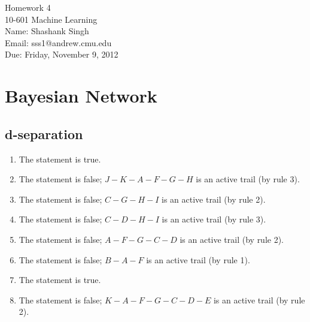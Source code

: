 \documentclass[11pt]{article}
\makeatletter
\newcommand{\myname}{Shashank Singh}
\newcommand{\myandrew}{sss1@andrew.cmu.edu}
\newcommand{\myclass}{10-601 Machine Learning}
\newcommand{\myhwnum}{4}
\newcommand{\duedate}{Friday, November 9, 2012}
\makeatother
\begin{document}
\thispagestyle{plain}

{\Large Homework \myhwnum} \\
\myclass \\
Name: \myname \\
Email: \myandrew \\
Due: \duedate \\
\section{Bayesian Network}
\subsection{d-separation}
\begin{enumerate}[1.]
\item The statement is true.

\item The statement is false; $J-K-A-F-G-H$ is an active trail (by rule 3).

\item The statement is false; $C-G-H-I$ is an active trail (by rule 2).

\item The statement is false; $C-D-H-I$ is an active trail (by rule 3).

\item The statement is false; $A-F-G-C-D$ is an active trail (by rule 2).

\item The statement is false; $B-A-F$ is an active trail (by rule 1).

\item The statement is true.

\item The statement is false; $K-A-F-G-C-D-E$ is an active trail (by rule 2).

\end{enumerate}

\end{document}

